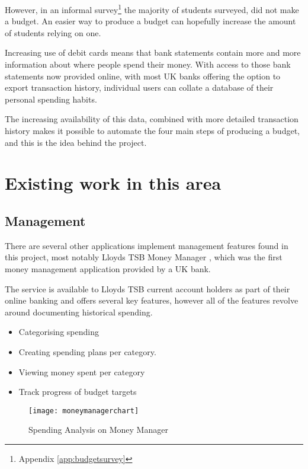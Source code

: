 However, in an informal survey\footnote{Appendix \ref{app:budgetsurvey}} the majority of students surveyed, did not make a budget. An easier way to produce a budget can hopefully increase the amount of students relying on one.

Increasing use of debit cards\cite{bbc2010debit} means that bank statements contain more and more information about where people spend their money. With access to those bank statements now provided online, with most UK banks offering the option to export \gls{transaction} history, individual users can collate a database of their personal spending habits.

The increasing availability of this data, combined with more detailed transaction history makes it possible to automate the four main steps of producing a budget, and this is the idea behind the project.

\section{Existing work in this area}

\subsection{Management}
There are several other applications implement management features found in this project, most notably Lloyds TSB Money Manager \cite{lloyds2014money}, which was the first money management application provided by a UK bank.

The service is available to Lloyds TSB current account holders as part of their online banking and offers several key features, however all of the features revolve around documenting historical spending.

\begin{itemize}
\item Categorising spending
\item Creating spending plans per category.
\item Viewing money spent per category
\item Track progress of budget targets
\end{itemize}

\begin{figure}[h]
    \centering
    \texttt{[image: moneymanagerchart]}
    \caption{Spending Analysis on Money Manager \parencite{lloyds2014money}}
    \label{fig:moneymanager}
\end{figure}

